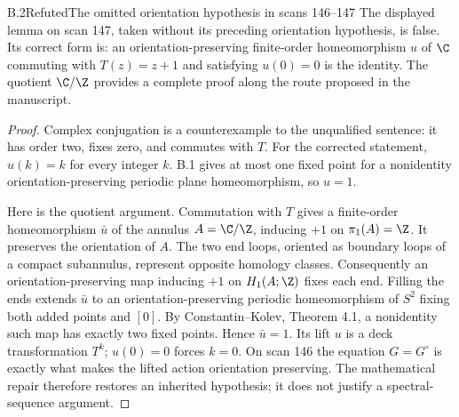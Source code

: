 \begin{claim}{B.2}{Refuted}{The omitted orientation hypothesis in scans 146--147}
The displayed lemma on scan 147, taken without its preceding orientation
hypothesis, is false. Its correct form is: an orientation-preserving finite-order
homeomorphism $u$ of $\C$ commuting with $T(z)=z+1$ and satisfying $u(0)=0$ is
the identity. The quotient $\C/\Z$ provides a complete proof along the route
proposed in the manuscript.
\end{claim}
\begin{proof}
Complex conjugation is a counterexample to the unqualified sentence: it has
order two, fixes zero, and commutes with $T$. For the corrected statement,
$u(k)=k$ for every integer $k$. B.1 gives at most one fixed point for a
nonidentity orientation-preserving periodic plane homeomorphism, so $u=1$.

Here is the quotient argument. Commutation with $T$ gives a finite-order
homeomorphism $\bar u$ of the annulus $A=\C/\Z$, inducing $+1$ on
$\pi_1(A)=\Z$. It preserves the orientation of $A$. The two end loops, oriented
as boundary loops of a compact subannulus, represent opposite homology classes.
Consequently an orientation-preserving map inducing $+1$ on $H_1(A;\Z)$ fixes
each end. Filling the ends extends $\bar u$ to an orientation-preserving periodic
homeomorphism of $S^2$ fixing both added points and $[0]$. By
Constantin--Kolev, Theorem 4.1, a nonidentity such map has exactly two fixed
points. Hence $\bar u=1$. Its lift $u$ is a deck transformation $T^k$; $u(0)=0$
forces $k=0$. On scan 146 the equation $G=G^\circ$ is exactly what makes the
lifted action orientation preserving. The mathematical repair therefore restores
an inherited hypothesis; it does not justify a spectral-sequence argument.
\end{proof}

